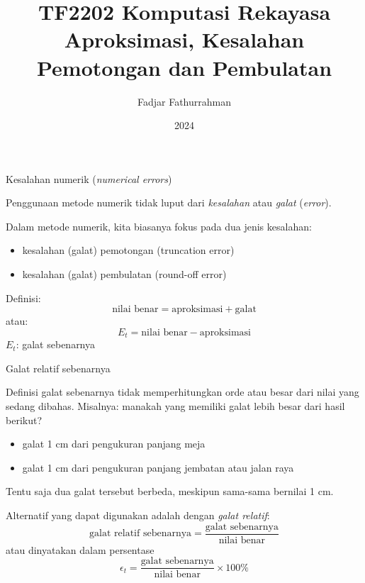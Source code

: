

\title{TF2202 Komputasi Rekayasa\\
Aproksimasi, Kesalahan Pemotongan dan Pembulatan}
\author{Fadjar Fathurrahman}
\date{2024}



\frame{\titlepage}

\begin{frame}{Kesalahan numerik (\textit{numerical errors})}

Penggunaan metode numerik tidak luput dari \emph{kesalahan} atau
\emph{galat} (\emph{error}).

Dalam metode numerik, kita biasanya fokus pada dua jenis kesalahan:
\begin{itemize}\tightlist
\item kesalahan (galat) pemotongan (truncation error)
\item kesalahan (galat) pembulatan (round-off error)
\end{itemize}

Definisi:
\begin{equation*}
\text{nilai benar} = \text{aproksimasi} + \text{galat}
\end{equation*}
atau:
\begin{equation*}
E_{t} = \text{nilai benar} - \text{aproksimasi}
\end{equation*}
$E_t$: galat sebenarnya

\end{frame}


\begin{frame}{Galat relatif sebenarnya}

Definisi galat sebenarnya tidak memperhitungkan orde atau besar
dari nilai yang sedang dibahas. Misalnya: manakah yang memiliki galat lebih
besar dari hasil berikut?
\begin{itemize}\tightlist
\item galat 1 cm dari pengukuran panjang meja
\item galat 1 cm dari pengukuran panjang jembatan atau jalan raya
\end{itemize}
Tentu saja dua galat tersebut berbeda, meskipun sama-sama bernilai
1 cm.

Alternatif yang dapat digunakan
adalah dengan \textit{galat relatif}:
\begin{equation*}
\text{galat relatif sebenarnya} = \frac{\text{galat sebenarnya}}{\text{nilai benar}}
\end{equation*}
atau dinyatakan dalam persentase
\begin{equation*}
\epsilon_{t} = \frac{\text{galat sebenarnya}}{\text{nilai benar}} \times 100\%
\end{equation*}

\end{frame}



